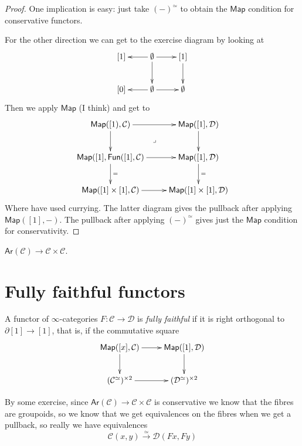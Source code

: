 \begin{proof}
One implication is easy: just take
$(-)^\simeq$ to obtain the $\mathsf{Map}$ condition
for conservative functors.

For the other direction we can get to
the exercise diagram by looking at
$$
\xymatrix{
[1]&\emptyset\ar[l]\ar[r]\ar[d]& [1]\ar[d]\\
[0]&\emptyset\ar[l]\ar[r]&\emptyset
}
$$
Then we apply $\mathsf{Map}$ (I think) and get to
$$
\xymatrix{
\mathsf{Map}([1),\mathcal{C})\ar[r]\ar[d]\ar@{}[dr]|-{\lrcorner}&
\mathsf{Map}([1],\mathcal{D})\ar[d]\\
\mathsf{Map}([1],\mathsf{Fun}([1],\mathcal{C})\ar[r]\ar[d]^{=}&
\mathsf{Map}([1],\mathcal{D})\ar[d]^=\\
\mathsf{Map}([1]\times[1],\mathcal{C})\ar[r]&
\mathsf{Map}([1]\times[1],\mathcal{D})
}
$$
Where have used currying.
The latter diagram gives the pullback
after applying $\mathsf{Map}([1],-)$.
The pullback after applying $(-)^\simeq$
gives just the $\mathsf{Map}$ condition
for conservativity.
\end{proof}

\begin{proposition}
\label{proposition-arrow-functor-is-conservative}
$\mathsf{Ar}(\mathcal{C})\to \mathcal{C} \times \mathcal{C}$.
\end{proposition}

\section{Fully faithful functors}
\label{section-fully-faithful-functors}

\begin{definition}
\label{definition-fully-faithful}
A functor of $\infty$-categories $F:\mathcal{C} \to \mathcal{D}$ 
is {\it fully faithful} if it is
right orthogonal to $\partial[1] \to [1]$,
that is, if the commutative square
$$
\xymatrix{
\mathsf{Map}([x],\mathcal{C})\ar[r]\ar[d]&
\mathsf{Map}([1],\mathcal{D})\ar[d]\\
(\mathcal{C}^\simeq)^{\times 2}\ar[r]&
(\mathcal{D}^\simeq)^{\times 2}
}
$$
\end{definition}

By some exercise, since 
$\mathsf{Ar}(\mathcal{C})\to \mathcal{C}\times\mathcal{C}$
is conservative we know that the fibres
are groupoids, so we know that we get equivalences
on the fibres when we get a pullback, so really we have
equivalences
$$
\mathcal{C}(x,y)\xrightarrow{\simeq}\mathcal{D}(Fx,Fy)
$$



